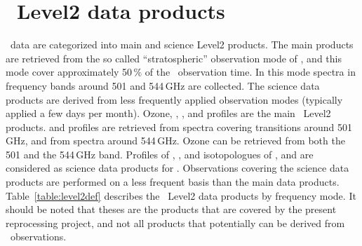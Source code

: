 \section{\smr\ Level2 data products}

\smr\ data are categorized into main and science Level2 products.
The main products are retrieved from the so called ``stratospheric'' observation mode
of \smr, and this mode cover approximately 50\,\(\%\) of the \smr\ observation time.
In this mode spectra in frequency bands around 501 and 544\,GHz are collected.
The science data products are derived from less frequently applied observation modes
(typically applied a few days per month).
Ozone, , , and  profiles
are the main \smr\ Level2 products.
 and  profiles are retrieved from spectra covering
transitions around 501\,GHz, and  from spectra around 544\,GHz.
Ozone can be retrieved from both the 501 and the 544\,GHz band.
Profiles of , ,  and
isotopologues of , and 
are considered as science data products for \smr.
Observations covering the science data products are performed on a less 
frequent basis than the main data products. 
Table~\ref{table:level2def} describes the \smr\ Level2 data products
by frequency mode. It should be noted that theses are the products
that are covered by the present reprocessing project, and not all
products that potentially can be derived from \smr\ observations.
